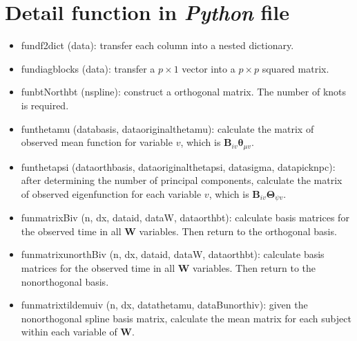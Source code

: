 \documentclass[useAMS,usenatbib,referee]{article}
\newcommand{\BW}{{\pmb W}}
\newcommand{\BB}{{\pmb B}}
\newcommand{\BThe}{{\pmb \Theta}}
\newcommand{\Bthe}{{\pmb \theta}}
\begin{document}
\section{Detail function in \textit{Python} file}
\begin{itemize}
    \item fun\textunderscore df2dict (data): transfer each column into a nested dictionary.
    \item  fun\textunderscore diag\textunderscore blocks (data): transfer a $p \times 1$ vector into a $p \times p$ squared matrix.
    \item  fun\textunderscore b\textunderscore t\textunderscore N\textunderscore orth\textunderscore b\textunderscore t (n\textunderscore spline): construct a orthogonal matrix. The number of knots is required. 
    \item  fun\textunderscore theta\textunderscore mu (data\textunderscore basis, data\textunderscore original\textunderscore theta\textunderscore mu): calculate the matrix of observed mean function for variable $v$, which is $\BB_{iv} \Bthe_{\mu v}$.
    \item  fun\textunderscore theta\textunderscore psi (data\textunderscore orth\textunderscore basis, data\textunderscore original\textunderscore theta\textunderscore psi, data\textunderscore sigma, data\textunderscore pick\textunderscore n\textunderscore pc): after determining the number of principal components, calculate the matrix of observed eigenfunction for each variable $v$, which is $\BB_{iv} \BThe_{\psi v}$.
    \item fun\textunderscore matrix\textunderscore B\textunderscore iv (n, dx, data\textunderscore id, data\textunderscore W, data\textunderscore orth\textunderscore b\textunderscore t): calculate basis matrices for the observed time in all $\BW$ variables. Then return to the orthogonal basis. 
     \item fun\textunderscore matrix\textunderscore unorth\textunderscore B\textunderscore iv (n, dx, data\textunderscore id, data\textunderscore W, data\textunderscore orth\textunderscore b\textunderscore t): calculate basis matrices for the observed time in all $\BW$ variables. Then return to the nonorthogonal basis. 
     \item  fun\textunderscore matrix\textunderscore tilde\textunderscore mu\textunderscore iv (n, dx, data\textunderscore theta\textunderscore mu, data\textunderscore B\textunderscore unorth\textunderscore iv): given the nonorthogonal spline basis matrix, calculate the mean matrix for each subject within each variable of $\BW$.

\end{itemize}
\end{document}
